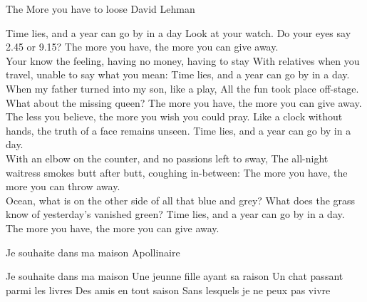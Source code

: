 \begin{poem}
{The More you have to loose}
{David Lehman}

Time lies, and a year can go by in a day
Look at your watch. Do your eyes say 2.45 or 9.15?
The more you have, the more you can give away.\\

Your know the feeling, having no money, having to stay
With relatives when you travel, unable to say what you mean:
Time lies, and a year can go by in a day.\\

When my father turned into my son, like a play,
All the fun took place off-stage. What about the missing queen?
The more you have, the more you can give away.\\

The less you believe, the more you wish you could pray.
Like a clock without hands, the truth of a face remains unseen.
Time lies, and a year can go by in a day.\\

With an elbow on the counter, and no passions left to sway,
The all-night waitress smokes butt after butt, coughing in-between: 
The more you have, the more you can throw away.\\

Ocean, what is on the other side of all that blue and grey?
What does the grass know of yesterday's vanished green?
Time lies, and a year can go by in a day.
The more you have, the more you can give away.
\end{poem}


\begin{poem}
{Je souhaite dans ma maison}
{Apollinaire}

Je souhaite dans ma maison
Une jeunne fille ayant sa raison
Un chat passant parmi les livres
Des amis en tout saison
Sans lesquels je ne peux pas vivre
\end{poem}

